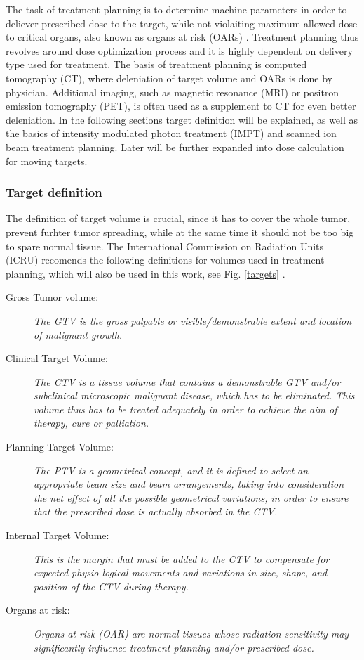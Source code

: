 \documentclass[type=dr, dr=rernat, accentcolor=tud7b,colorbacktitle, bigchapter, openright, twoside, 12pt ]{tudthesis}
\begin{document}
The task of treatment planning is to determine machine parameters in order to deliever prescribed dose to the target, while not violaiting maximum allowed dose to critical organs, also known as organs at risk (OARs) \cite{Richter2012}.
Treatment planning thus revolves around dose optimization process and it is highly dependent on delivery type used for treatment. The basis of treatment planning is computed tomography (CT), where deleniation of target volume and OARs is
done by physician. Additional imaging, such as magnetic resonance (MRI) or positron emission tomography (PET), is often used as a supplement to CT for even better deleniation. In the following sections target definition will be explained,
as well as the basics of intensity modulated photon treatment (IMPT) and scanned ion beam treatment planning. Later will be further expanded into dose calculation for moving targets.

\subsubsection{Target definition}
The definition of target volume is crucial, since it has to cover the whole tumor, prevent furhter tumor spreading, while at the same time it should not be too big to spare normal tissue. 
The International Commission on Radiation Units (ICRU) recomends the following definitions for volumes used in treatment planning, which will also be used in this work, see Fig. \ref{targets} \cite{ICRU50, ICRU62}.

\begin{description}
\item[Gross Tumor volume:] \emph{The GTV is the gross
    palpable or visible/demonstrable extent and location of malignant
    growth.}
\item[Clinical Target Volume:] \emph{The CTV is a tissue
    volume that contains a demonstrable GTV and/or subclinical
    microscopic malignant disease, which has to be eliminated. This
    volume thus has to be treated adequately in order to achieve the
    aim of therapy, cure or palliation.}
\item[Planning Target Volume:] \emph{The PTV is a geometrical
    concept, and it is defined to select an appropriate beam size and
    beam arrangements, taking into consideration the net effect of all
    the possible geometrical variations, in order to ensure that the
    prescribed dose is actually absorbed in the CTV.}
\item[Internal Target Volume:] \emph{This is the margin that must be
    added to the CTV to compensate for expected physio-logical
    movements and variations in size, shape, and position of the
    CTV during therapy.}
\item[Organs at risk:] \emph{Organs at risk (OAR) are normal
    tissues whose radiation sensitivity may significantly influence
    treatment planning and/or prescribed dose.}
\end{description}
\end{document}
